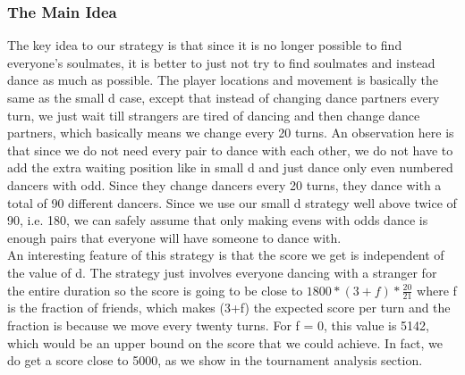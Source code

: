 \subsubsection{The Main Idea}
The key idea to our strategy is that since it is no longer possible to find everyone's soulmates, it is better to just not try to find soulmates and instead dance as much as possible. The player locations and movement is basically the same as the small d case, except that instead of changing dance partners every turn, we just wait till strangers are tired of dancing and then change dance partners, which basically means we change every 20 turns. An observation here is that since we do not need every pair to dance with each other, we do not have to add the extra waiting position like in small d and just dance only even numbered dancers with odd. Since they change dancers every 20 turns, they dance with a total of 90 different dancers. Since we use our small d strategy well above twice of 90, i.e. 180, we can safely assume that only making evens with odds dance is enough pairs that everyone will have someone to dance with.\\
An interesting feature of this strategy is that the score we get is independent of the value of d. The strategy just involves everyone dancing with a stranger for the entire duration so the score is going to be close to $1800*(3+f)*\frac{20}{21}$ where f is the fraction of friends, which makes (3+f) the expected score per turn and the fraction is because we move every twenty turns. For f = 0, this value is 5142, which would be an upper bound on the score that we could achieve. In fact, we do get a score close to 5000, as we show in the tournament analysis section.\\ 
